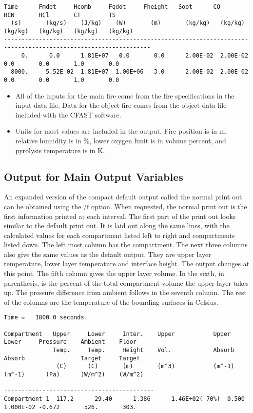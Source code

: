 \begin{lstlisting}[basicstyle=\tiny]
  Time      Fmdot     Hcomb     Fqdot     Fheight   Soot      CO        HCN       HCl       CT        TS
  (s)       (kg/s)    (J/kg)    (W)       (m)       (kg/kg)   (kg/kg)   (kg/kg)   (kg/kg)   (kg/kg)   (kg/kg)
----------------------------------------------------------------------------------------------------------------
     0.      0.0      1.81E+07   0.0       0.0      2.00E-02  2.00E-02   0.0       0.0       1.0       0.0
  8000.     5.52E-02  1.81E+07  1.00E+06   3.0      2.00E-02  2.00E-02   0.0       0.0       1.0       0.0
\end{lstlisting}

\begin{itemize}
\item All of the inputs for the main fire come from the fire specifications in the input data file. Data for the object fire comes from the object data file included with the CFAST software.
\item Units for most values are included in the output.  Fire position is in m, relative humidity is in \%, lower oxygen limit is in volume percent, and pyrolysis temperature is in K.
\end{itemize}

\subsection{Output for Main Output Variables}

An expanded version of the compact default output called the normal print out can be obtained using the /f option.  When requested, the normal print out is the first information printed at each interval.  The first part of the print out looks similar to the default print out.  It is laid out along the same lines, with the calculated values for each compartment listed left to right and compartments listed down.  The left most column has the compartment.  The next three columns also give the same values as the default output.  They are upper layer temperature, lower layer temperature and interface height.  The output changes at this point. The fifth column gives the upper layer volume.  In the sixth, in parenthesis, is the percent of the total compartment volume the upper layer takes up.  The pressure difference from ambient follows in the seventh column.  The rest of the columns are the temperature of the bounding surfaces in Celsius.

\begin{lstlisting}[basicstyle=\tiny]
Time =   1800.0 seconds.

Compartment   Upper     Lower     Inter.    Upper           Upper      Lower     Pressure    Ambient    Floor
              Temp.     Temp.     Height    Vol.            Absorb     Absorb                Target     Target
               (C)      (C)       (m)       (m^3)           (m^-1)     (m^-1)      (Pa)      (W/m^2)    (W/m^2)
-----------------------------------------------------------------------------------------------------------------
Compartment 1  117.2      29.40      1.386      1.46E+02( 70%)  0.500      1.000E-02 -0.672       526.       303.
\end{lstlisting}

